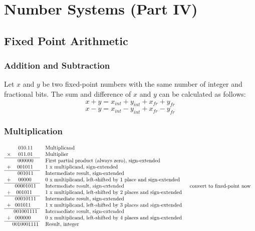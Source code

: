 \documentclass[12pt,openany, tikz,border=10pt]{book}
\begin{document}
\chapter{Number Systems (Part IV)}
\section{Fixed Point Arithmetic}
\subsection{Addition and Subtraction}

Let \( x \) and \( y \) be two fixed-point numbers with the same number of integer and fractional bits. The sum and difference of \( x \) and \( y \) can be calculated as follows:
 $$x + y = x_{int} + y_{int} + x_{fr} + y_{fr}$$ 
 $$x - y = x_{int} - y_{int} + x_{fr} - y_{fr}$$
 
 \subsection{Multiplication}
 
 
 \begin{align*}
     \begin{array}{r@{}c@{}l}
         & 010.11 & \text{\quad Multiplicand} \\
       \times & 011.01 & \text{\quad Multiplier} \\ \cline{1-2}
         & 000000 & \text{\quad First partial product (always zero), sign-extended} \\ 
       + & \; \; \; \; 001011\phantom{.00} & \text{\quad 1 x multiplicand, sign-extended} \\ \cline{1-2}
         & 001011 & \text{\quad Intermediate result, sign-extended} \\ 
       + & \phantom{0}00000\phantom{.0} & \text{\quad 0 x multiplicand, left-shifted by 1 place and sign-extended} \\ \cline{1-2}
         & 00001011\phantom{} & \text{\quad Intermediate result, sign-extended} \\ 
       + & \phantom{00}001011\phantom{000} & \text{\quad 1 x multiplicand, left-shifted by 2 places and sign-extended} \\ \cline{1-2}
         & 00010111 & \text{\quad Intermediate result, sign-extended} \\ 
       + & 001011\phantom{00} & \text{\quad 1 x multiplicand, left-shifted by 3 places and sign-extended} \\ \cline{1-2}
         & 001001111 & \text{\quad Intermediate result, sign-extended} \\ 
       + & 000000\phantom{00}& \text{\quad 0 x multiplicand, left-shifted by 4 places and sign-extended} \\ \cline{1-2}
         & 0010001111 & \text{\quad Result, integer} \\
     \end{array} & \text{\quad convert to fixed-point now}
  \end{align*}
\end{document}
